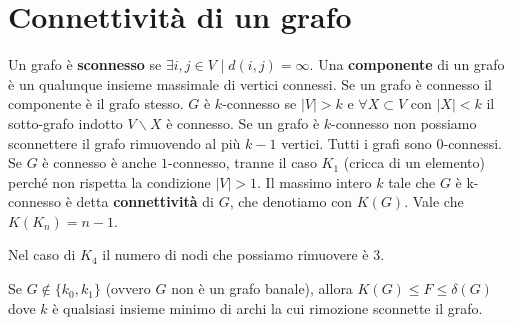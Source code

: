\documentclass[12pt]{report}
\begin{document}
\section{Connettività di un grafo}
Un grafo è \textbf{sconnesso} se $\exists i,j \in V$ $|\; d(i,j) = \infty$. Una \textbf{componente} di un grafo è un qualunque insieme massimale di vertici connessi. Se un grafo è connesso il componente è il grafo stesso. $G$ è $k$-connesso se $|V| > k$ e $\forall X \subset V$ con $|X| < k$ il sotto-grafo indotto $V \backslash X$ è connesso.  Se un grafo è $k$-connesso non possiamo sconnettere il grafo rimuovendo al più $k-1$ vertici. Tutti i grafi sono $0$-connessi. Se $G$ è connesso è anche $1$-connesso, tranne il caso $K_1$ (cricca di un elemento) perché non rispetta la condizione $|V| > 1$. Il massimo intero $k$ tale che $G$ è k-connesso è detta \textbf{connettività} di $G$, che denotiamo con $K(G)$. Vale che $K(K_n) = n-1$.

\begin{exmp}
    Nel caso di $K_4$
    il numero di nodi che possiamo rimuovere è $3$.
\end{exmp}

\begin{teo}
    Se $G \notin \{k_0,k_1\}$ (ovvero $G$ non è un grafo banale), allora $K(G) \leq F \leq \delta(G)$ dove $k$ è qualsiasi insieme minimo di archi la cui rimozione sconnette il grafo.
\end{teo}
\end{document}
